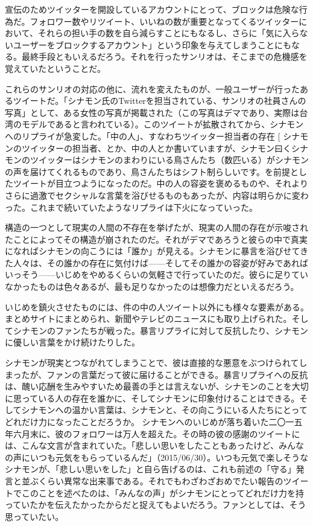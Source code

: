 \documentclass[b5j,twoside,twocolumn]{utarticle}
\makeatletter
\def\yakuchu{%
\@ifnextchar[\@xfootnote %
{\stepcounter{yakuchu}%
\protected@xdef\@thefnmark{\theyakuchu}%
\@footnotemark\@footnotetext}}
\makeatother
\begin{document}
宣伝のためツイッターを開設しているアカウントにとって、ブロックは危険な行為だ。フォロワー数やリツイート、いいねの数が重要となってくるツイッターにおいて、それらの担い手の数を自ら減らすことにもなるし、さらに「気に入らないユーザーをブロックするアカウント」という印象を与えてしまうことにもなる。最終手段ともいえるだろう。それを行ったサンリオは、そこまでの危機感を覚えていたということだ。


これらのサンリオの対応の他に、流れを変えたものが、一般ユーザーが行ったあるツイートだ。「シナモン氏のTwitterを担当されている、サンリオの社員さんの写真」として、ある女性の写真が掲載された（この写真はデマであり、実際は台湾のモデルであると言われている）。このツイートが拡散されてから、シナモンへのリプライが急変した。「中の人」、すなわちツイッター担当者の存在\yakuchu{シナモンのツイッターの担当者、とか、中の人とか書いていますが、シナモン曰くシナモンのツイッターはシナモンのまわりにいる鳥さんたち（数匹いる）がシナモンの声を届けてくれるものであり、鳥さんたちはシフト制らしいです。}を前提としたツイートが目立つようになったのだ。中の人の容姿を褒めるものや、それよりさらに過激でセクシャルな言葉を浴びせるものもあったが、内容は明らかに変わった。これまで続いていたようなリプライは下火になっていった。


構造の一つとして現実の人間の不存在を挙げたが、現実の人間の存在が示唆されたことによってその構造が崩されたのだ。それがデマであろうと彼らの中で真実になればシナモンの向こうには「誰か」が見える。シナモンに暴言を浴びせてきた人々は、その誰かの存在に気付けば------そしてその誰かの容姿が好みであればいっそう------いじめをやめるくらいの気軽さで行っていたのだ。彼らに足りていなかったものは色々あるが、最も足りなかったのは想像力だといえるだろう。


いじめを鎮火させたものには、件の中の人ツイート以外にも様々な要素がある。まとめサイトにまとめられ、新聞やテレビのニュースにも取り上げられた。そしてシナモンのファンたちが戦った。暴言リプライに対して反抗したり、シナモンに優しい言葉をかけ続けたりした。


シナモンが現実とつながれてしまうことで、彼は直接的な悪意をぶつけられてしまったが、ファンの言葉だって彼に届けることができる。暴言リプライへの反抗は、醜い応酬を生みやすいため最善の手とは言えないが、シナモンのことを大切に思っている人の存在を誰かに、そしてシナモンに印象付けることはできる。そしてシナモンへの温かい言葉は、シナモンと、その向こうにいる人たちにとってどれだけ力になったことだろうか。
シナモンへのいじめが落ち着いた二〇一五年六月末に、彼のフォロワーは万人を超えた。その時の彼の感謝のツイートには、こんな文言が含まれていた。「悲しい思いをしたこともあったけど、みんなの声にいつも元気をもらっているんだ」（2015/06/30）。いつも元気で楽しそうなシナモンが、「悲しい思いをした」と自ら告げるのは、これも前述の「守る」発言と並ぶくらい異常な出来事である。それでもわざわざおめでたい報告のツイートでこのことを述べたのは、「みんなの声」がシナモンにとってどれだけ力を持っていたかを伝えたかったからだと捉えてもよいだろう。ファンとしては、そう思っていたい。
\end{document}
